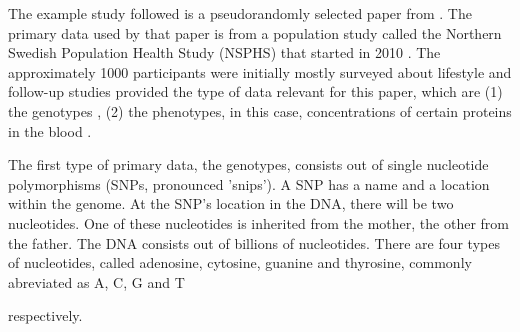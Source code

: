 The example study followed is a pseudorandomly selected paper
from \cite{ahsan2017relative}. The primary data used by that paper is
from a population study called the Northern Swedish Population
Health Study (NSPHS) that started in 2010 \cite{igl2010northern}. 
The approximately 1000 participants were initially mostly surveyed
about lifestyle \cite{igl2010northern} and follow-up studies
provided the type of data relevant for this paper, 
which are (1) the genotypes \cite{johansson2013identification},
(2) the phenotypes, in this case, concentrations of certain proteins in the 
blood \cite{enroth2014strong,enroth2015effect}.

The first type of primary data, the genotypes, 
consists out of single nucleotide polymorphisms (SNPs, pronounced 'snips').
A SNP has a name and a location within the genome.
At the SNP's location in the DNA, there will be two nucleotides.
One of these nucleotides is inherited from the mother, 
the other from the father.
The DNA consists out of billions of nucleotides.
There are four types of nucleotides,
called adenosine, cytosine, guanine and thyrosine, 
commonly abreviated as A, C, G and T 

respectively.


